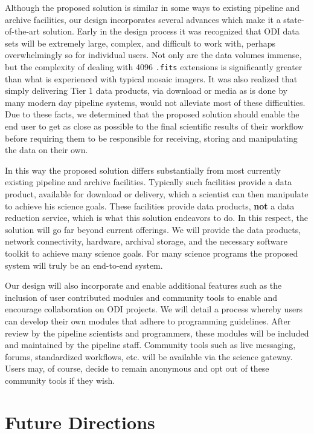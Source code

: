 \documentclass[10pt,conference]{IEEEtran}
\begin{document}
Although the proposed solution is similar in some ways to existing pipeline and archive facilities, our design incorporates several advances which make it a state-of-the-art solution. Early in the design process it was recognized that ODI data sets will be extremely large, complex, and difficult to work with, perhaps overwhelmingly so for individual users. Not only are the data volumes immense, but the complexity of dealing with 4096 {\tt .fits} extensions is significantly greater than what is experienced with typical mosaic imagers. It was also realized that simply delivering Tier 1 data products, via download or media as is done by many modern day pipeline systems, would not alleviate most of these difficulties. Due to these facts, we determined that the proposed solution should enable the end user to get as close as possible to the final scientific results of their workflow before requiring them to be responsible for receiving, storing and manipulating the data on their own. 

In this way the proposed solution differs substantially from most currently existing pipeline and archive facilities. Typically such facilities provide a data product, available for download or delivery, which a scientist can then manipulate to achieve his science goals. These facilities provide data products, {\bf not} a data reduction service, which is what this solution endeavors to do. In this respect, the solution will go far beyond current offerings. We will provide the data products, network connectivity, hardware, archival storage, and the necessary software toolkit to achieve many science goals. For many science programs the proposed system will truly be an end-to-end system.

Our design will also incorporate and enable additional features such as the inclusion of user contributed modules and community tools to enable and encourage collaboration on ODI projects. We will detail a process whereby users can develop their own modules that adhere to programming guidelines. After review by the pipeline scientists and programmers, these modules will be included and maintained by the pipeline staff. Community tools such as live messaging, forums, standardized workflows, etc. will be available via the science gateway. Users may, of course, decide to remain anonymous and opt out of these community tools if they wish. 

\section{Future Directions}\label{sec:future}
\end{document}
